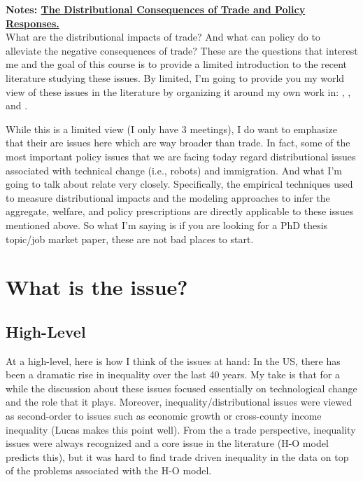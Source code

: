 \documentclass[pdftex,12pt]{article}
\begin{document}
\pagestyle{fancy}

\noindent \textbf{Notes: \href{http://www.waugheconomics.com/}{ The Distributional Consequences of Trade and Policy Responses.}}\\

\noindent  What are the distributional impacts of trade? And what can policy do to alleviate the negative consequences of trade?  These are the questions that interest me and the goal of this course is to provide a limited introduction to the recent literature studying these issues. By limited, I'm going to provide you my world view of these issues in the literature by organizing it around my own work in: \citet{lyon2019}, \citet{lyon2018redistributing}, and \citet{waugh_consumption}.

\medskip
\noindent While this is a limited view (I only have 3 meetings), I do want to emphasize that their are issues here which are way broader than trade. In fact, some of the most important policy issues that we are facing today regard distributional issues associated with technical change (i.e., robots) and immigration. And what I'm going to talk about relate very closely. Specifically, the empirical techniques used to measure distributional impacts and the modeling approaches to infer the aggregate, welfare, and policy prescriptions are directly applicable to these issues mentioned above. So what I'm saying is if you are looking for a PhD thesis topic/job market paper, these are not bad places to start.

\section{What is the issue?}

\subsection{High-Level}

At a high-level, here is how I think of the issues at hand: In the US, there has been a dramatic rise in inequality over the last 40 years. My take is that for a while the discussion about these issues focused essentially on technological change and the role that it plays. Moreover, inequality/distributional issues were viewed as second-order to issues such as economic growth or cross-county income inequality (Lucas makes this point well). From the a trade perspective, inequality issues were always recognized and a core issue in the literature (H-O model predicts this), but it was hard to find trade driven inequality in the data on top of the problems associated with the H-O model.
\end{document}
